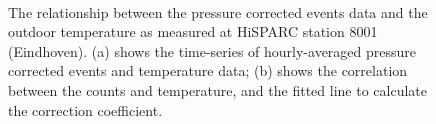 \begin{figure}[ht!]
	\centering
	 \\
	
	\caption{The relationship between the pressure corrected events data and the outdoor temperature as measured at HiSPARC station 8001 (Eindhoven). (a) shows the time-series of hourly-averaged pressure corrected events and temperature data; (b) shows the correlation between the counts and temperature, and the fitted line to calculate the correction coefficient.}
	\label{fig:CR_V_T}
\end{figure}

